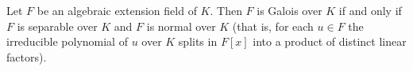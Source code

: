 Let $F$ be an algebraic extension field of $K$. Then $F$ is Galois over $K$ if and only if $F$ is separable over $K$ and $F$ is normal over $K$ (that is, for each $u \in F$ the irreducible polynomial of $u$ over $K$ splits in $F[x]$ into a product of distinct linear factors).
